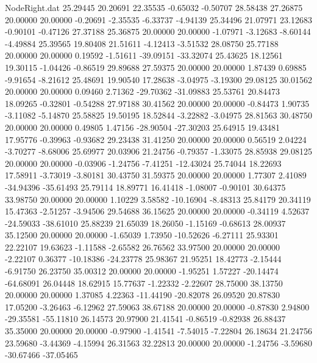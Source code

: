 \begin{filecontents}{NodeRight.dat}
  25.29445   20.20691   22.35535    -0.65032   -0.50707   28.58438   27.26875   20.00000   20.00000   -0.20691   -2.35535   -6.33737   -4.94139
  25.34496   21.07971   23.12683    -0.90101   -0.47126   27.37188   25.36875   20.00000   20.00000   -1.07971   -3.12683   -8.60144   -4.49884
  25.39565   19.80408   21.51611    -4.12413   -3.51532   28.08750   25.77188   20.00000   20.00000    0.19592   -1.51611  -39.09151  -33.32074
  25.43625   18.12561   19.30115    -1.04426   -0.86519   29.89688   27.59375   20.00000   20.00000    1.87439    0.69885   -9.91654   -8.21612
  25.48691   19.90540   17.28638    -3.04975   -3.19300   29.08125   30.01562   20.00000   20.00000    0.09460    2.71362  -29.70362  -31.09883
  25.53761   20.84473   18.09265    -0.32801   -0.54288   27.97188   30.41562   20.00000   20.00000   -0.84473    1.90735   -3.11082   -5.14870
  25.58825   19.50195   18.52844    -3.22882   -3.04975   28.81563   30.48750   20.00000   20.00000    0.49805    1.47156  -28.90504  -27.30203
  25.64915   19.43481   17.95776    -0.39963   -0.93682   29.23438   31.41250   20.00000   20.00000    0.56519    2.04224   -3.70277   -8.68006
  25.69977   20.03906   21.24756    -0.79357   -1.33075   28.85938   29.08125   20.00000   20.00000   -0.03906   -1.24756   -7.41251  -12.43024
  25.74044   18.22693   17.58911    -3.73019   -3.80181   30.43750   31.59375   20.00000   20.00000    1.77307    2.41089  -34.94396  -35.61493
  25.79114   18.89771   16.41418    -1.08007   -0.90101   30.64375   33.98750   20.00000   20.00000    1.10229    3.58582  -10.16904   -8.48313
  25.84179   20.34119   15.47363    -2.51257   -3.94506   29.54688   36.15625   20.00000   20.00000   -0.34119    4.52637  -24.59033  -38.61010
  25.88239   21.65039   18.26050    -1.15169   -0.68613   28.00937   35.12500   20.00000   20.00000   -1.65039    1.73950  -10.52626   -6.27111
  25.93301   22.22107   19.63623    -1.11588   -2.65582   26.76562   33.97500   20.00000   20.00000   -2.22107    0.36377  -10.18386  -24.23778
  25.98367   21.95251   18.42773    -2.15444   -6.91750   26.23750   35.00312   20.00000   20.00000   -1.95251    1.57227  -20.14474  -64.68091
  26.04448   18.62915   15.77637    -1.22332   -2.22607   28.75000   38.13750   20.00000   20.00000    1.37085    4.22363  -11.44190  -20.82078
  26.09520   20.87830   17.05200    -3.26463   -6.12962   27.59063   38.67188   20.00000   20.00000   -0.87830    2.94800  -29.35581  -55.11810
  26.14573   20.97900   21.41541    -0.86519   -0.82938   26.88437   35.35000   20.00000   20.00000   -0.97900   -1.41541   -7.54015   -7.22804
  26.18634   21.24756   23.59680    -3.44369   -4.15994   26.31563   32.22813   20.00000   20.00000   -1.24756   -3.59680  -30.67466  -37.05465

\end{filecontents}
